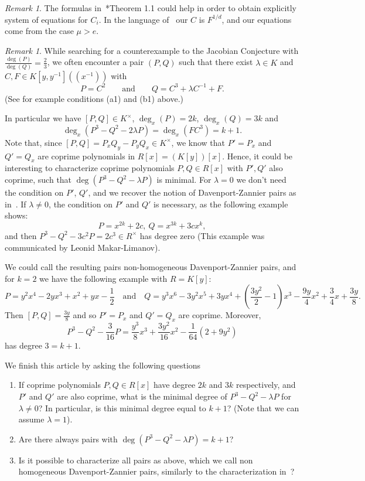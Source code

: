 \documentclass[reqno,a4paper]{amsart}
\theoremstyle{definition}
\theoremstyle{remark}
\newtheorem{remark}[theorem]{Remark}
\begin{document}
\begin{remark}
  The formulas in~\cite{HLLN}*{Theorem 1.1} could help in order to obtain explicitly system of equations for $C_i$.
  In the language of~\cite{HLLN} our $C$ is $F^{1/d}$, and our equations come from the case $\mu>e$.
\end{remark}

\begin{remark}
While searching for a counterexample to
the Jacobian Conjecture with $\frac{\deg(P)}{\deg(Q)}=\frac 23$, we often encounter a pair $(P,Q)$ such that
  there exist $\lambda\in K$ and $C,F\in K[y,y^{-1}]((x^{-1}))$ with
$$
P=C^2\qquad\text{and}\qquad Q=C^3+\lambda C^{-1}+F.
$$
(See for example conditions (a1) and (b1) above.)

In particular we have $[P,Q]\in K^{\times}$, $\deg_x(P)=2k$, $\deg_x(Q)=3k$ and
\begin{equation}\label{cubo menos cuadrado}
  \deg_x(P^3-Q^2-2\lambda P)=\deg_x(FC^3)=k+1.
\end{equation}
Note that, since $[P,Q]=P_x Q_y-P_y Q_x\in K^{\times}$, we know that $P'=P_x$ and $Q'=Q_x$ are coprime polynomials in $R[x]=(K[y])[x]$.
Hence, it could be interesting to characterize coprime polynomials $P,Q\in R[x]$ with $P',Q'$ also coprime,
such that $\deg(P^3-Q^2-\lambda P)$ is minimal. For $\lambda=0$ we don't need the condition on $P'$, $Q'$, and we recover the notion of
Davenport-Zannier pairs as in~\cite{APZ}. If $\lambda\ne 0$, the condition on $P'$ and $Q'$ is necessary, as the following example shows:
$$
P = x^{2k} + 2c, \  Q = x^{3k} + 3cx^k,
$$
and then $P^3 - Q^2 - 3c^2P = 2c^3\in R^{\times}$ has degree zero (This example was communicated by Leonid Makar-Limanov).

We could call the resulting pairs non-homogeneous Davenport-Zannier pairs, and for $k=2$ we have the following example with $R=K[y]$:
$$
P=y^2 x^4-2y x^3+x^2+y x-\frac 12\quad\text{and}\quad
Q=y^3 x^6-3y^2 x^5+3y x^4+\left( \frac{3y^2}{2}-1\right)x^3-\frac{9y}{4}x^2+\frac 34 x+\frac{3y}{8}.
$$
Then $[P,Q]=\frac{3y}{8}$ and so $P'=P_x$ and $Q'=Q_x$ are coprime. Moreover,
$$
P^3-Q^2-\frac{3}{16} P=\frac{y^3}{8}x^3+\frac{3y^2}{16}x^2-\frac{1}{64}(2+9y^2)
$$
has degree $3=k+1$.

We finish this article by asking the following questions
\begin{enumerate}
  \item If coprime polynomials $P,Q\in R[x]$ have degree $2k$ and $3k$ respectively,
  and $P'$ and $Q'$ are also coprime, what is the minimal degree of $P^3-Q^2-\lambda P$ for $\lambda\ne 0$? In particular, is this minimal degree equal to $k+1$? (Note that
  we can assume $\lambda=1$).
  \item Are there always pairs with $\deg(P^3-Q^2-\lambda P)=k+1$?
  \item Is it possible to characterize all pairs as above, which we call non homogeneous
  Davenport-Zannier pairs, similarly to the characterization in~\cite{APZ}?    
\end{enumerate}
\end{remark}
\end{document}

